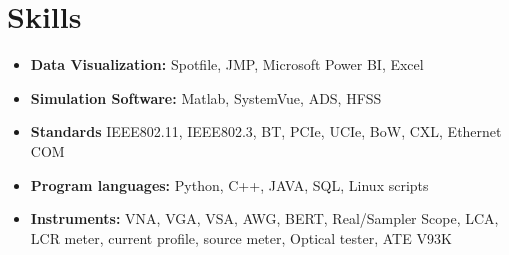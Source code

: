 \documentclass[11pt,a4paper,sans]{moderncv}
\begin{document}
\section{Skills}
{\begin{itemize}[label=\textbullet, itemsep=0pt]
\item {\textbf{Data Visualization:} Spotfile, JMP, Microsoft Power BI, Excel}
\item {\textbf{Simulation Software:} Matlab, SystemVue, ADS, HFSS}
\item {\textbf{Standards} IEEE802.11, IEEE802.3, BT, PCIe, UCIe, BoW, CXL, Ethernet COM}
\item {\textbf{Program languages:} Python, C++, JAVA, SQL, Linux scripts}
\item {\textbf{Instruments:} VNA, VGA, VSA, AWG, BERT, Real/Sampler Scope, LCA, LCR meter, current profile, source meter, Optical tester, ATE V93K}
\end{itemize}}
\end{document}
